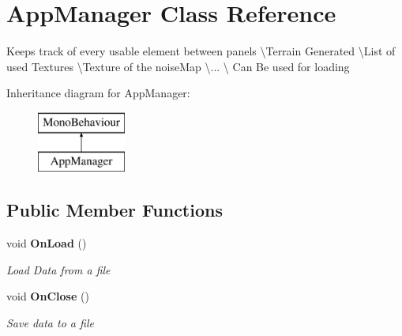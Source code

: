\section{App\+Manager Class Reference}
\label{class_app_manager}


Keeps track of every usable element between panels \textbackslash{}Terrain Generated \textbackslash{}List of used Textures \textbackslash{}Texture of the noise\+Map \textbackslash{}... \textbackslash{} Can Be used for loading  


Inheritance diagram for App\+Manager\+:\begin{figure}[H]
\begin{center}
\leavevmode
\includegraphics[height=2.000000cm]{class_app_manager}
\end{center}
\end{figure}
\subsection*{Public Member Functions}
\begin{DoxyCompactItemize}
\item 
void \textbf{ On\+Load} ()
\begin{DoxyCompactList}\small\item\em Load Data from a file \end{DoxyCompactList}\item 
void \textbf{ On\+Close} ()
\begin{DoxyCompactList}\small\item\em Save data to a file \end{DoxyCompactList}\end{DoxyCompactItemize}
